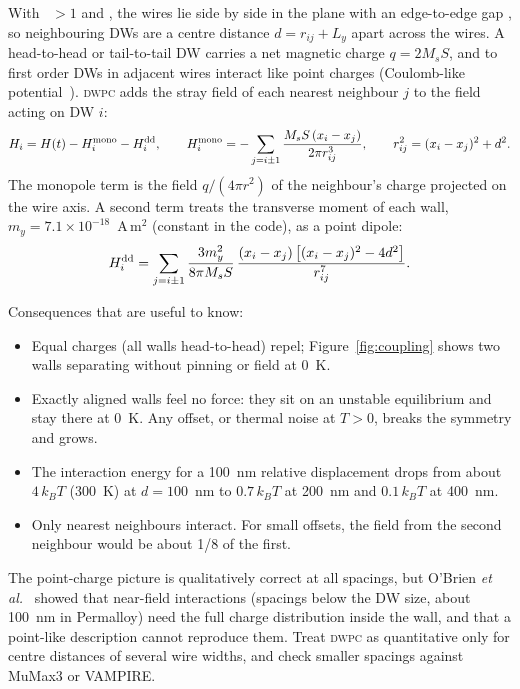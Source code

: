 \documentclass[11pt,a4paper]{report}
\newcommand{\key}[1]{\texttt{\detokenize{#1}}}
\newcommand{\dwpc}{\textsc{dwpc}}
\begin{document}
With \key{Nwires}~$>1$ and \key{use_DW_coupling=1}, the wires lie side by side in the plane with an edge-to-edge gap \key{rij}, so neighbouring DWs are a centre distance $d=r_{ij}+L_y$ apart across the wires. A head-to-head or tail-to-tail DW carries a net magnetic charge $q=2M_sS$, and to first order DWs in adjacent wires interact like point charges (Coulomb-like potential~\cite{hayward}). \dwpc{} adds the stray field of each nearest neighbour $j$ to the field acting on DW $i$:
\begin{equation}
H_i=H(t)-H_i^{\rm mono}-H_i^{\rm dd},\qquad H_i^{\rm mono}=-\sum_{j=i\pm1}\frac{M_sS\,(x_i-x_j)}{2\pi r_{ij}^3},\qquad r_{ij}^2=(x_i-x_j)^2+d^2 .
\end{equation}
The monopole term is the field $q/(4\pi r^2)$ of the neighbour's charge projected on the wire axis. A second term treats the transverse moment of each wall, $m_y=7.1\times10^{-18}$~A\,m$^2$ (constant in the code), as a point dipole:
\begin{equation}
H_i^{\rm dd}=\sum_{j=i\pm1}\frac{3m_y^2}{8\pi M_sS}\,\frac{(x_i-x_j)\left[(x_i-x_j)^2-4d^2\right]}{r_{ij}^7}.
\end{equation}

Consequences that are useful to know:
\begin{itemize}
\item Equal charges (all walls head-to-head) repel; Figure~\ref{fig:coupling} shows two walls separating without pinning or field at 0~K.
\item Exactly aligned walls feel no force: they sit on an unstable equilibrium and stay there at 0~K. Any offset, or thermal noise at $T>0$, breaks the symmetry and grows.
\item The interaction energy for a 100~nm relative displacement drops from about $4\,k_BT$ (300~K) at $d=100$~nm to $0.7\,k_BT$ at 200~nm and $0.1\,k_BT$ at 400~nm.
\item Only nearest neighbours interact. For small offsets, the field from the second neighbour would be about 1/8 of the first.
\end{itemize}

The point-charge picture is qualitatively correct at all spacings, but O'Brien \emph{et al.}~\cite{obrien} showed that near-field interactions (spacings below the DW size, about 100~nm in Permalloy) need the full charge distribution inside the wall, and that a point-like description cannot reproduce them. Treat \dwpc{} as quantitative only for centre distances of several wire widths, and check smaller spacings against MuMax3 or VAMPIRE.
\end{document}
